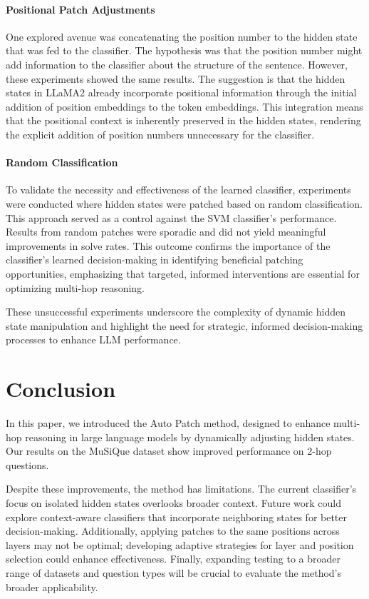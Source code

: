 \documentclass[11pt]{article}
\begin{document}
\paragraph{Positional Patch Adjustments} One explored avenue was concatenating the position number to the hidden state that was fed to the classifier. The hypothesis was that the position number might add information to the classifier about the structure of the sentence. However, these experiments showed the same results. The suggestion is that the hidden states in LLaMA2 already incorporate positional information through the initial addition of position embeddings to the token embeddings. This integration means that the positional context is inherently preserved in the hidden states, rendering the explicit addition of position numbers unnecessary for the classifier.

\paragraph{Random Classification} To validate the necessity and effectiveness of the learned classifier, experiments were conducted where hidden states were patched based on random classification. This approach served as a control against the SVM classifier's performance. Results from random patches were sporadic and did not yield meaningful improvements in solve rates. This outcome confirms the importance of the classifier’s learned decision-making in identifying beneficial patching opportunities, emphasizing that targeted, informed interventions are essential for optimizing multi-hop reasoning.

These unsuccessful experiments underscore the complexity of dynamic hidden state manipulation and highlight the need for strategic, informed decision-making processes to enhance LLM performance.


\section{Conclusion}
In this paper, we introduced the Auto Patch method, designed to enhance multi-hop reasoning in large language models by dynamically adjusting hidden states. Our results on the MuSiQue dataset show improved performance on 2-hop questions.

Despite these improvements, the method has limitations. The current classifier's focus on isolated hidden states overlooks broader context. Future work could explore context-aware classifiers that incorporate neighboring states for better decision-making. Additionally, applying patches to the same positions across layers may not be optimal; developing adaptive strategies for layer and position selection could enhance effectiveness. Finally, expanding testing to a broader range of datasets and question types will be crucial to evaluate the method’s broader applicability.
\end{document}
